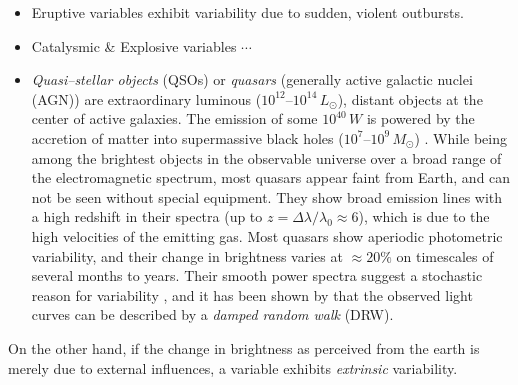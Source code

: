 \begin{itemize}
\item Eruptive variables exhibit variability due to sudden, violent outbursts.
\item Catalysmic \& Explosive variables $\cdots$


\item \emph{Quasi--stellar objects} (QSOs) or \emph{quasars} (generally active galactic nuclei (AGN)) are extraordinary luminous ($10^{12}$--$10^{14} \, \unit{L_\odot}$), distant objects at the center of active galaxies. The emission of some $10^{40} \, \unit{W}$ is powered by the accretion of matter into supermassive black holes ($10^7$--$10^9 \, \unit{M_\odot}$) \citep{hanslmeier2007}. While being among the brightest objects in the observable universe over a broad range of the electromagnetic spectrum, most quasars appear faint from Earth, and can not be seen without special equipment. They show broad emission lines with a high redshift in their spectra (up to $z  = \Delta \lambda / \lambda_0 \approx 6$), which is due to the high velocities of the emitting gas. Most quasars show aperiodic photometric variability, and their change in brightness varies at $\approx 20\%$ on timescales of several months to years. Their smooth power spectra suggest a stochastic reason for variability \citep{macleod2010}, and it has been shown by \citet{kozlowski2010} that the observed light curves can be described by a \emph{damped random walk} (DRW).


\end{itemize}

On the other hand, if the change in brightness as perceived from the earth is merely due to external influences, a variable exhibits \emph{extrinsic} variability.

